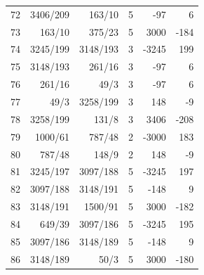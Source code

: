\documentclass[11pt,a4paper]{article}
\begin{document}
\begin{minipage}[t]{.49\linewidth}
\begin{tabular*}{\linewidth}{@{}r@{\extracolsep{\fill}}rrrrr@{}}
72 & 3406/209 & 163/10 & 5 & -97 & 6\\
73 & 163/10 & 375/23 & 5 & 3000 & -184\\
74 & 3245/199 & 3148/193 & 3 & -3245 & 199\\
75 & 3148/193 & 261/16 & 3 & -97 & 6\\
76 & 261/16 & 49/3 & 3 & -97 & 6\\
77 & 49/3 & 3258/199 & 3 & 148 & -9\\
78 & 3258/199 & 131/8 & 3 & 3406 & -208\\
79 & 1000/61 & 787/48 & 2 & -3000 & 183\\
80 & 787/48 & 148/9 & 2 & 148 & -9\\
81 & 3245/197 & 3097/188 & 5 & -3245 & 197\\
82 & 3097/188 & 3148/191 & 5 & -148 & 9\\
83 & 3148/191 & 1500/91 & 5 & 3000 & -182\\
84 & 649/39 & 3097/186 & 5 & -3245 & 195\\
85 & 3097/186 & 3148/189 & 5 & -148 & 9\\
86 & 3148/189 & 50/3 & 5 & 3000 & -180\\
\bottomrule\end{tabular*}\end{minipage}\par
\clearpage
{}\par\vspace{4pt}
\end{document}
